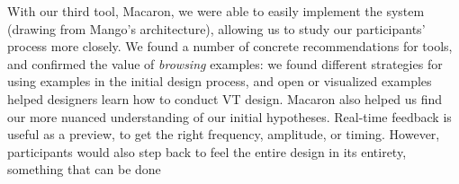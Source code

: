 With our third tool, Macaron, we were able to easily implement the system (drawing from Mango's architecture), allowing us to study our participants' process more closely.
We found a number of concrete recommendations for \haxd tools, and confirmed the value of \emph{browsing} examples: we found different strategies for using examples in the initial design process, and open or visualized examples helped designers learn how to conduct VT design.
 Macaron also helped us find our more nuanced understanding of our initial hypotheses. Real-time feedback is useful as a preview, to get the right frequency, amplitude, or timing. However, participants would also step back to feel the entire design in its entirety, something that can be done

